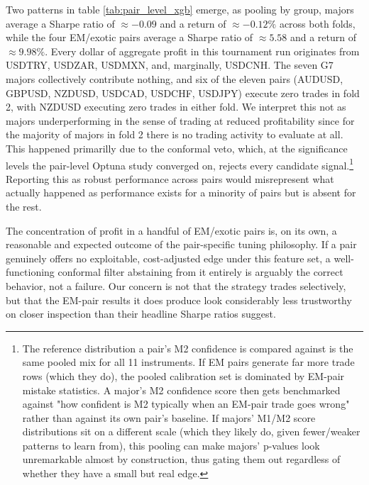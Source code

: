 \documentclass[12pt, a4paper]{article}
\begin{document}
Two patterns in table \ref{tab:pair_level_xgb} emerge, as pooling by group, majors average a Sharpe ratio of $\approx -0.09$ and a return of $\approx -0.12\%$ across both folds, 
while the four EM/exotic pairs average a Sharpe ratio of $\approx 5.58$ and a return of $\approx 9.98\%$. Every dollar of aggregate profit in this tournament run originates from 
USDTRY, USDZAR, USDMXN, and, marginally, USDCNH. The seven G7 majors collectively contribute nothing, and six of the eleven pairs (AUDUSD, GBPUSD, NZDUSD, USDCAD, USDCHF, USDJPY) 
execute zero trades in fold 2, with NZDUSD executing zero trades in either fold. We interpret this not as majors underperforming in the sense of trading at reduced profitability 
since for the majority of majors in fold 2 there is no trading activity to evaluate at all. This happened primarilly due to the conformal veto, which, at the significance levels 
the pair-level Optuna study converged on, rejects every candidate signal.\footnote{The reference distribution a pair's M2 confidence is compared against is the same pooled mix for 
all 11 instruments. If EM pairs generate far more trade rows (which they do), the pooled calibration set is dominated by EM-pair mistake statistics. A major's M2 confidence score 
then gets benchmarked against "how confident is M2 typically when an EM-pair trade goes wrong" rather than against its own pair's baseline. 
If majors' M1/M2 score distributions sit on a different scale (which they likely do, given fewer/weaker patterns to learn from), this pooling can make majors' p-values look 
unremarkable almost by construction, thus gating them out regardless of whether they have a small but real edge.} 
Reporting this as robust performance across pairs would misrepresent what actually happened as performance exists for a minority of pairs but is absent for the rest.

\medskip

The concentration of profit in a handful of EM/exotic pairs is, on its own, a reasonable and expected outcome of the pair-specific tuning philosophy. If a pair genuinely offers 
no exploitable, cost-adjusted edge under this feature set, a well-functioning conformal filter abstaining from it entirely is arguably the correct behavior, not a failure. Our 
concern is not that the strategy trades selectively, but that the EM-pair results it does produce look considerably less trustworthy on closer inspection than their headline 
Sharpe ratios suggest.
\end{document}
